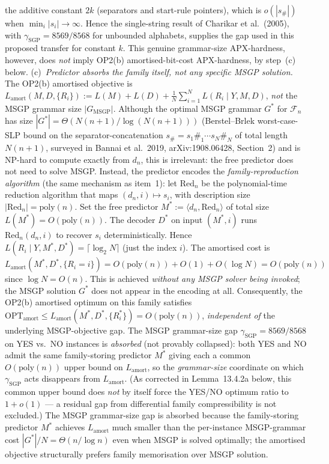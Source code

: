 \documentclass[
]{article}
\begin{document}
\begin{enumerate}
the additive constant $2k$ (separators and start-rule pointers),
which is $o(|s_\#|)$ when $\min_i |s_i| \to \infty$. Hence
the single-string result of Charikar et al.\ (2005), with
$\gamma_{\mathrm{SGP}} = 8569/8568$ for unbounded alphabets, supplies
the gap used in this proposed transfer for constant $k$. This
genuine grammar-size APX-hardness, however, does \emph{not}
imply OP2(b) amortised-bit-cost APX-hardness, by step~(c) below.
(c)~\emph{Predictor absorbs the family itself, not any specific
MSGP solution.} The OP2(b) amortised objective is
$L_{\mathrm{amort}}(M,D,\{R_i\}) := L(M) + L(D) + \frac{1}{N}
\sum_{i=1}^{N} L(R_i \mid Y,M,D)$, \emph{not} the MSGP grammar
size $|G_{\mathrm{MSGP}}|$. Although the optimal MSGP grammar
$G^*$ for $\mathcal{F}_n$ has size $|G^*| = \Theta(N(n+1) /
\log(N(n+1)))$ (Berstel--Brlek worst-case-SLP bound on the
separator-concatenation $s_\# = s_1 \#_1 \cdots s_N \#_N$ of
total length $N(n+1)$, surveyed in Bannai et al.\ 2019,
arXiv:1908.06428, Section~2) and is NP-hard to compute exactly
from $d_n$, this is irrelevant: the free predictor does not
need to solve MSGP. Instead, the predictor encodes the
\emph{family-reproduction algorithm} (the same mechanism as
item~1): let $\mathrm{Red}_n$ be the polynomial-time reduction
algorithm that maps $(d_n, i) \mapsto s_i$, with description
size $|\mathrm{Red}_n| = \mathrm{poly}(n)$. Set the free
predictor $M^* := \langle d_n, \mathrm{Red}_n \rangle$ of
total size $L(M^*) = O(\mathrm{poly}(n))$. The decoder $D^*$
on input $(M^*, i)$ runs $\mathrm{Red}_n(d_n, i)$ to recover
$s_i$ deterministically. Hence $L(R_i \mid Y, M^*, D^*) =
\lceil \log_2 N \rceil$ (just the index $i$). The amortised
cost is $L_{\mathrm{amort}}(M^*, D^*, \{R_i = i\}) =
O(\mathrm{poly}(n)) + O(1) + O(\log N) = O(\mathrm{poly}(n))$
since $\log N = O(n)$. This is achieved \emph{without any MSGP
solver being invoked}; the MSGP solution $G^*$ does not appear
in the encoding at all. Consequently, the OP2(b) amortised
optimum on this family satisfies $\mathrm{OPT}_{\mathrm{amort}}
\leq L_{\mathrm{amort}}(M^*, D^*, \{R_i^*\}) =
O(\mathrm{poly}(n))$, \emph{independent of} the underlying
MSGP-objective gap. The MSGP grammar-size gap
$\gamma_{\mathrm{SGP}} = 8569/8568$ on YES vs.\ NO instances
is \emph{absorbed} (not provably collapsed): both YES and NO
admit the same family-storing predictor $M^*$ giving each a
common $O(\mathrm{poly}(n))$ upper bound on $L_{\mathrm{amort}}$,
so the \emph{grammar-size} coordinate on which
$\gamma_{\mathrm{SGP}}$ acts disappears from $L_{\mathrm{amort}}$.
(As corrected in Lemma~13.4.2a below, this common upper bound does
\emph{not} by itself force the YES/NO optimum ratio to $1+o(1)$ ---
a residual gap from differential family compressibility is not
excluded.) The MSGP grammar-size gap is absorbed because the
family-storing predictor $M^*$ achieves $L_{\mathrm{amort}}$
much smaller than the
per-instance MSGP-grammar cost $|G^*|/N = \Theta(n/\log n)$
even when MSGP is solved optimally; the amortised objective
structurally prefers family memorisation over MSGP solution.


\end{enumerate}
\end{document}

